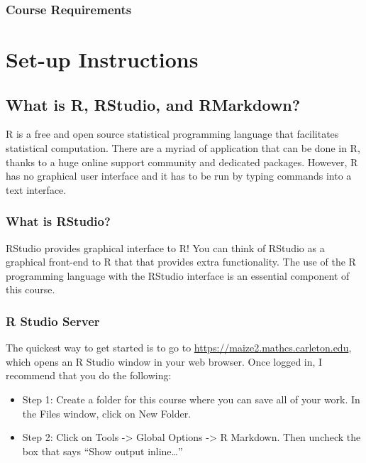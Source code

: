 \documentclass[
]{book}
\providecommand{\tightlist}{%
  \setlength{\itemsep}{0pt}\setlength{\parskip}{0pt}}
\begin{document}
\hypertarget{course-requirements}{%
\section{Course Requirements}\label{course-requirements}}

\hypertarget{part-set-up-instructions}{%
\part*{Set-up Instructions}\label{part-set-up-instructions}}

\hypertarget{rstudio}{%
\chapter{What is R, RStudio, and RMarkdown?}\label{rstudio}}

R is a free and open source statistical programming language that facilitates statistical computation. There are a myriad of application that can be done in R, thanks to a huge online support community and dedicated packages. However, R has no graphical user interface and it has to be run by typing commands into a text interface.

\hypertarget{what-is-rstudio}{%
\section{What is RStudio?}\label{what-is-rstudio}}

RStudio provides graphical interface to R! You can think of RStudio as a graphical front-end to R that that provides extra functionality. The use of the R programming language with the RStudio interface is an essential component of this course.

\hypertarget{r-studio-server}{%
\section{R Studio Server}\label{r-studio-server}}

The quickest way to get started is to go to \url{https://maize2.mathcs.carleton.edu}, which opens an R Studio window in your web browser. Once logged in, I recommend that you do the following:

\begin{itemize}
\tightlist
\item
  Step 1: Create a folder for this course where you can save all of your work. In the Files window, click on New Folder.
\item
  Step 2: Click on Tools -\textgreater{} Global Options -\textgreater{} R Markdown. Then uncheck the box that says ``Show output inline\ldots{}''
\end{itemize}
\end{document}
